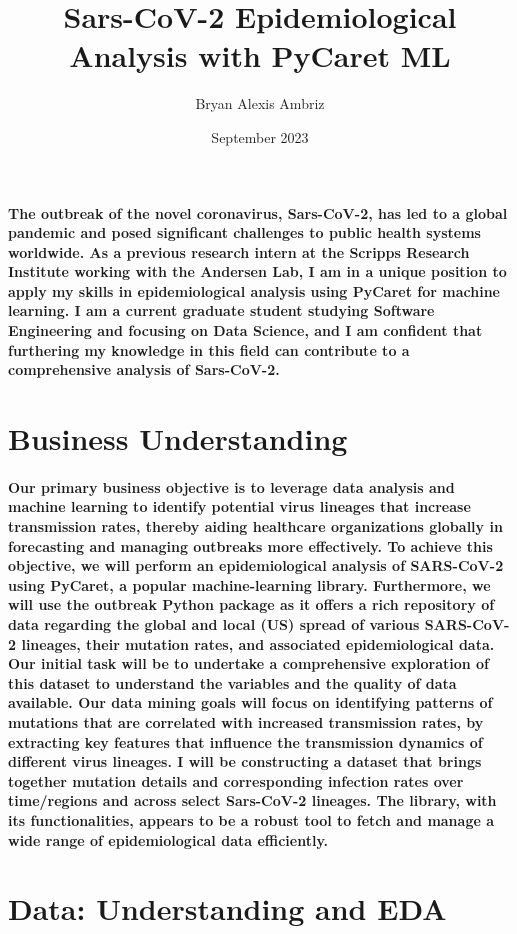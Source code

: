 \documentclass{article}
\title{Sars-CoV-2 Epidemiological Analysis with PyCaret ML}
\author{Bryan Alexis Ambriz}
\date{September 2023}
\begin{document}
\maketitle
\paragraph{The outbreak of the novel coronavirus, Sars-CoV-2, has led to a global pandemic and posed significant challenges to public health systems worldwide. As a previous research intern at the Scripps Research Institute working with the Andersen Lab, I am in a unique position to apply my skills in epidemiological analysis using PyCaret for machine learning. I am a current graduate student studying Software Engineering and focusing on Data Science, and I am confident that furthering my knowledge in this field can contribute to a comprehensive analysis of Sars-CoV-2.}
\section{\textbf{Business Understanding}}
\paragraph{Our primary business objective is to leverage data analysis and machine learning to identify potential virus lineages that increase transmission rates, thereby aiding healthcare organizations globally in forecasting and managing outbreaks more effectively. To achieve this objective, we will perform an epidemiological analysis of SARS-CoV-2 using PyCaret, a popular machine-learning library. Furthermore, we will use the outbreak Python package as it offers a rich repository of data regarding the global and local (US) spread of various SARS-CoV-2 lineages, their mutation rates, and associated epidemiological data. Our initial task will be to undertake a comprehensive exploration of this dataset to understand the variables and the quality of data available. Our data mining goals will focus on identifying patterns of mutations that are correlated with increased transmission rates, by extracting key features that influence the transmission dynamics of different virus lineages. I will be constructing a dataset that brings together mutation details and corresponding infection rates over time/regions and across select Sars-CoV-2 lineages. The library, with its functionalities, appears to be a robust tool to fetch and manage a wide range of epidemiological data efficiently.}
\section{\textbf{Data: Understanding and EDA}}
\end{document}
